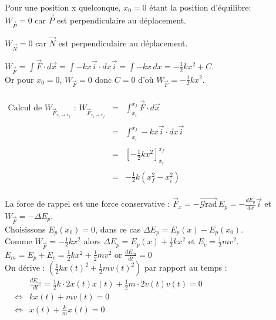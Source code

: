 \documentclass[a4paper,10pt]{book}
\begin{document}
Pour une position x quelconque, $x_{0}=0$ étant la position d'équilibre:\\

$W_{\vec{P}}=0$ car $\vec{P}$ est perpendiculaire au déplacement.

$W_{\vec{N}}=0$ car $\vec{N}$ est perpendiculaire au déplacement.

$\displaystyle W_{\vec{F}}=\int \vec{F}\cdot d\vec{x}=\int -kx\vec{i}\cdot dx\vec{i}=\int -kx \, dx=-\frac{1}{2}kx^{2}+C$.\\
Or pour $x_{0}=0$, $W_{\vec{F}}=0$ donc $C=0$ d'où $W_{\vec{F}}=-\frac{1}{2}kx^{2}$.\\\\

$\begin{array}{rcl} \text{Calcul de }W_{\vec{F}_{x_{i}\rightarrow x_{f}}}\text{ : }W_{\vec{F}_{x_{i}\rightarrow x_{f}}}&=&\displaystyle\int_{x_{i}}^{x_{f}} \vec{F}\cdot d\vec{x}\\\\
&=&\displaystyle\int_{x_{i}}^{x_{f}} -kx\vec{i}\cdot dx\vec{i}\\\\
&=&[-\frac{1}{2}kx^{2}]_{x_{i}}^{x_{f}}\\\\
&=&-\frac{1}{2}k(x_{f}^{2}-x_{i}^{2}) \end{array}$\\\\

La force de rappel est une force conservative : $\vec{F}_{x}=-\overrightarrow{\mathcal{G}\text{rad}}\,E_{p}=-\frac{dE_{p}}{dx}\vec{i}$ et $W_{\vec{F}}=-\Delta E_{p}$.\\

Choisissons $E_{p}(x_{0})=0$, dans ce cas $\Delta E_{p}=E_{p}(x)-E_{p}(x_{0})$.\\

Comme $W_{\vec{F}}=-\frac{1}{2}kx^{2}$ alors $\Delta E_{p}=E_{p}(x)+\frac{1}{2}kx^{2}\text{ et }E_{c}=\frac{1}{2}mv^{2}$.\\

$E_{m}=E_{p}+E_{c}=\frac{1}{2}kx^{2}+\frac{1}{2}mv^{2}$ or $\frac{dE_{m}}{dt}=0$\\

On dérive : $(\frac{1}{2}kx(t)^{2}+\frac{1}{2}mv(t)^{2})$ par rapport au temps :\\

$\begin{array}{rcl} &&\frac{dE_{m}}{dt}=\frac{1}{2}k\cdot 2\dot{x}(t)x(t)+\frac{1}{2}m\cdot 2\dot{v}(t)v(t)=0\\
&\Leftrightarrow &kx(t)+m\dot{v}(t)=0\\
&\Leftrightarrow &\ddot{x}(t)+\frac{k}{m}x(t)=0 \end{array}$\\
\end{document}
